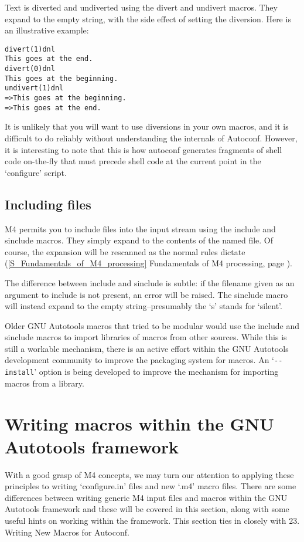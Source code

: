 Text is diverted and undiverted using the divert and undivert macros. They expand to the empty string, with the side effect of setting the diversion. Here is an illustrative example:

 	

\begin{verbatim}
divert(1)dnl
This goes at the end.
divert(0)dnl
This goes at the beginning.
undivert(1)dnl
=>This goes at the beginning.
=>This goes at the end.
\end{verbatim}


It is unlikely that you will want to use diversions in your own macros, and it is difficult to do reliably without understanding the internals of Autoconf. However, it is interesting to note that this is how autoconf generates fragments of shell code on-the-fly that must precede shell code at the current point in the `configure' script. 

\subsection{Including files}

M4 permits you to include files into the input stream using the include and sinclude macros. They simply expand to the contents of the named file. Of course, the expansion will be rescanned as the normal rules dictate
(\ref{S_Fundamentals_of_M4_processing} Fundamentals of M4 processing,
page \pageref{S_Fundamentals_of_M4_processing}).

The difference between include and sinclude is subtle: if the filename given as an argument to include is not present, an error will be raised. The sinclude macro will instead expand to the empty string--presumably the `s' stands for `silent'.

Older GNU Autotools macros that tried to be modular would use the include and 
sinclude macros to import libraries of macros from other sources. While this 
is still a workable mechanism, there is an active effort within the GNU 
Autotools development community to improve the packaging system for macros.
An `\verb+--install+' option is being developed to improve the mechanism for 
importing macros from a library. 

\section{Writing macros within the GNU Autotools framework}

With a good grasp of M4 concepts, we may turn our attention to applying these principles to writing `configure.in' files and new `.m4' macro files. There are some differences between writing generic M4 input files and macros within the GNU Autotools framework and these will be covered in this section, along with some useful hints on working within the framework. This section ties in closely with 23. Writing New Macros for Autoconf.

